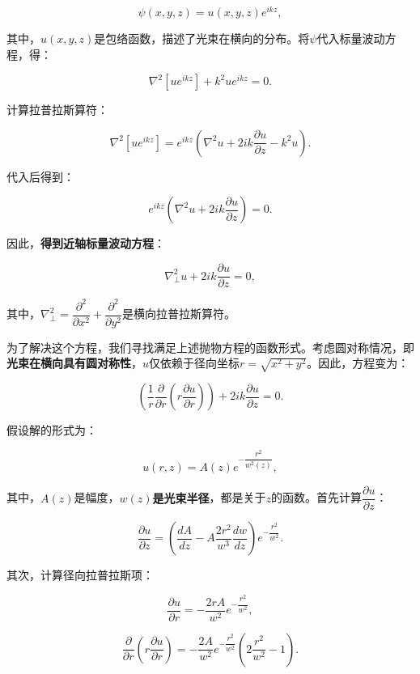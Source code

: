 \begin{enumerate}
\begin{enumerate}
\begin{itemize}
			\[
			\psi(x, y, z) = u(x, y, z) e^{i k z},
			\]
			
			其中，\(u(x, y, z)\)是包络函数，描述了光束在横向的分布。将\(\psi\)代入标量波动方程，得：
			
			\[
			\nabla^2 [u e^{i k z}] + k^2 u e^{i k z} = 0.
			\]
			
			计算拉普拉斯算符：
			
			\[
			\nabla^2 [u e^{i k z}] = e^{i k z} \left( \nabla^2 u + 2 i k \dfrac{\partial u}{\partial z} - k^2 u \right).
			\]
			
			代入后得到：
			
			\[
			e^{i k z} \left( \nabla^2 u + 2 i k \dfrac{\partial u}{\partial z} \right) = 0.
			\]
			
			\begin{ubox}{}
				因此，\textbf{得到近轴标量波动方程}：
				
				\[
				\nabla_\perp^2 u + 2 i k \dfrac{\partial u}{\partial z} = 0,
				\]
				
				其中，\(\nabla_\perp^2 = \dfrac{\partial^2}{\partial x^2} + \dfrac{\partial^2}{\partial y^2}\)是横向拉普拉斯算符。
			\end{ubox}
			
			为了解决这个方程，我们寻找满足上述抛物方程的函数形式。考虑圆对称情况，即\textbf{光束在横向具有圆对称性}，\(u\)仅依赖于径向坐标\(r = \sqrt{x^2 + y^2}\)。因此，方程变为：
			
			\[
			\left( \dfrac{1}{r} \dfrac{\partial}{\partial r} \left( r \dfrac{\partial u}{\partial r} \right) \right) + 2 i k \dfrac{\partial u}{\partial z} = 0.
			\]
			
			假设解的形式为：
			
			\[
			u(r, z) = A(z) e^{- \dfrac{r^2}{w^2(z)}},
			\]
			
			其中，\(A(z)\)是幅度，\textbf{\(w(z)\)是光束半径}，都是关于\(z\)的函数。首先计算\(\dfrac{\partial u}{\partial z}\)：
			
			\[
			\dfrac{\partial u}{\partial z} = \left( \dfrac{d A}{d z} - A \dfrac{2 r^2}{w^3} \dfrac{d w}{d z} \right) e^{- \dfrac{r^2}{w^2}}.
			\]
			
			其次，计算径向拉普拉斯项：
			
			\[
			\dfrac{\partial u}{\partial r} = - \dfrac{2 r A}{w^2} e^{- \dfrac{r^2}{w^2}},
			\]
			
			\[
			\dfrac{\partial}{\partial r} \left( r \dfrac{\partial u}{\partial r} \right) = - \dfrac{2 A}{w^2} e^{- \dfrac{r^2}{w^2}} \left( 2 \dfrac{r^2}{w^2} - 1 \right).
			\]
			

\end{itemize}
\end{enumerate}
\end{enumerate}
